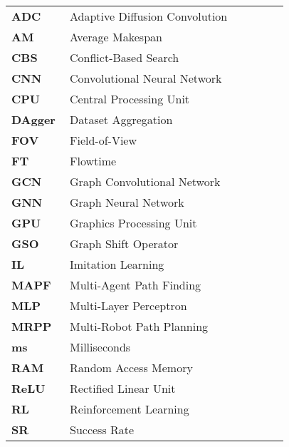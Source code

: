 
\begin{longtable}[l]{@{}p{0.2\linewidth} p{0.75\linewidth}@{}} %
\textbf{ADC} & Adaptive Diffusion Convolution \\
\textbf{AM} & Average Makespan \\
\textbf{CBS} & Conflict-Based Search \\
\textbf{CNN} & Convolutional Neural Network \\
\textbf{CPU} & Central Processing Unit \\
\textbf{DAgger} & Dataset Aggregation \\
\textbf{FOV} & Field-of-View \\
\textbf{FT} & Flowtime \\
\textbf{GCN} & Graph Convolutional Network \\
\textbf{GNN} & Graph Neural Network \\
\textbf{GPU} & Graphics Processing Unit \\
\textbf{GSO} & Graph Shift Operator \\
\textbf{IL} & Imitation Learning \\
\textbf{MAPF} & Multi-Agent Path Finding \\
\textbf{MLP} & Multi-Layer Perceptron \\
\textbf{MRPP} & Multi-Robot Path Planning \\
\textbf{ms} & Milliseconds \\

\textbf{RAM} & Random Access Memory \\
\textbf{ReLU} & Rectified Linear Unit \\
\textbf{RL} & Reinforcement Learning \\
\textbf{SR} & Success Rate \\
\end{longtable}